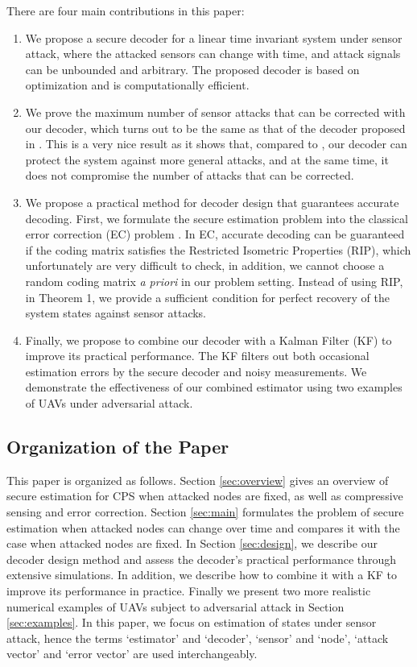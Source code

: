 \documentclass[journal]{IEEEtran}
\begin{document}
There are four main contributions in this paper:
\begin{enumerate}[listparindent=1.5em]
\item
We propose a secure decoder for a linear time invariant system under sensor attack, where the attacked sensors can change with time, and attack signals can be unbounded and arbitrary.
The proposed decoder is based on  optimization and is computationally efficient.
\item
We prove the maximum number of sensor attacks that can be corrected with our decoder, which turns out to be the same as that of the decoder proposed in \cite{Fawzi2014}. This is a very nice result as it shows that, compared to \cite{Fawzi2014}, our decoder can protect the system against more general attacks, and at the same time, it does not compromise the number of attacks that can be corrected.
\item
We propose a practical method for decoder design that guarantees accurate decoding. 
First, we formulate the secure estimation problem into the classical error correction (EC) problem \cite{Candes_Tao}. In EC, accurate decoding can be guaranteed if the coding matrix satisfies the Restricted Isometric Properties (RIP), which unfortunately are very difficult to check, in addition, we cannot choose a random coding matrix \textit{a priori} in our problem setting. 
Instead of using RIP, in Theorem 1, we provide a sufficient condition for perfect recovery of the system states against sensor attacks.



\item
Finally, we propose to combine our decoder with a Kalman Filter (KF) to improve its practical performance. 
The KF filters out both occasional estimation errors by the secure decoder and noisy measurements.
We demonstrate the effectiveness of our combined estimator using two examples of UAVs under adversarial attack.
\end{enumerate}




\subsection{Organization of  the Paper}
This paper is organized as follows. Section \ref{sec:overview} gives an overview of secure estimation for CPS when attacked nodes are fixed, as well as compressive sensing and error correction. 
Section \ref{sec:main} formulates the problem of secure estimation when attacked nodes can change over time and compares it with the case when attacked nodes are fixed. 
In Section \ref{sec:design}, we describe our decoder design method and assess the decoder's practical performance through extensive simulations. In addition, we describe how to combine it with a KF to improve its performance in practice. Finally we present two more realistic numerical examples of UAVs subject to adversarial attack in Section \ref{sec:examples}. 
In this paper, we focus on estimation of states under sensor attack, hence the terms `estimator' and `decoder', `sensor' and `node', `attack vector' and `error vector' are used interchangeably.
 
\end{document}
